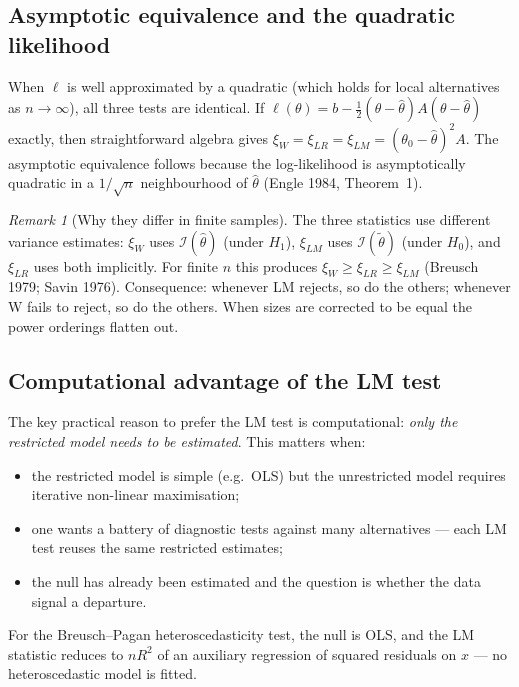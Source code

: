 \documentclass[a4paper,oneside,12pt]{extarticle}
\theoremstyle{plain}
\theoremstyle{definition}
\theoremstyle{remark}
\newtheorem{remark}[proposition]{Remark}
\begin{document}
\subsection{Asymptotic equivalence and the quadratic likelihood}

When $\ell$ is well approximated by a quadratic (which holds for
local alternatives as $n\to\infty$), all three tests are identical.
If $\ell(\theta) = b - \frac{1}{2}(\theta-\hat\theta)A(\theta-\hat\theta)$
exactly, then straightforward algebra gives
$\xi_W = \xi_{LR} = \xi_{LM} = (\theta_0-\hat\theta)^2 A$.
The asymptotic equivalence follows because the log-likelihood is
asymptotically quadratic in a $1/\sqrt{n}$ neighbourhood of
$\hat\theta$ (Engle 1984, Theorem~1).

\begin{remark}[Why they differ in finite samples]
The three statistics use different variance estimates:
$\xi_W$ uses $\mathcal{I}(\hat\theta)$ (under $H_1$),
$\xi_{LM}$ uses $\mathcal{I}(\tilde\theta)$ (under $H_0$),
and $\xi_{LR}$ uses both implicitly.  For finite $n$ this produces
$\xi_W \geq \xi_{LR} \geq \xi_{LM}$ (Breusch 1979; Savin 1976).
Consequence: whenever LM rejects, so do the others; whenever W
fails to reject, so do the others.  When sizes are corrected to be
equal the power orderings flatten out.
\end{remark}

\subsection{Computational advantage of the LM test}

The key practical reason to prefer the LM test is computational:
\emph{only the restricted model needs to be estimated}.  This matters when:
\begin{itemize}
  \item the restricted model is simple (e.g.\ OLS) but the
    unrestricted model requires iterative non-linear maximisation;
  \item one wants a battery of diagnostic tests against many
    alternatives --- each LM test reuses the same restricted
    estimates;
  \item the null has already been estimated and the question is
    whether the data signal a departure.
\end{itemize}
For the Breusch--Pagan heteroscedasticity test, the null is OLS,
and the LM statistic reduces to $nR^2$ of an auxiliary regression
of squared residuals on $x$ --- no heteroscedastic model is fitted.
\end{document}
